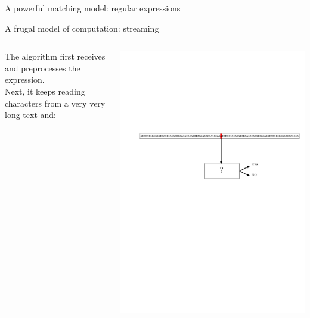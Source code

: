 \documentclass[aspectratio=169,10pt]{beamer}
\begin{document}
\begin{frame}{A powerful matching model: regular expressions}
    \bigskip
    \pause
    \bigskip
\end{frame}

\begin{frame}{A frugal model of computation: streaming}
\begin{columns}
    The algorithm first receives and preprocesses the expression.\\ Next, it keeps reading characters from a very very long text and:
    \begin{center}
        \includegraphics[width=\textwidth]{pictures/stream3}
    \end{center}
\end{columns}


\end{frame}
\end{document}
